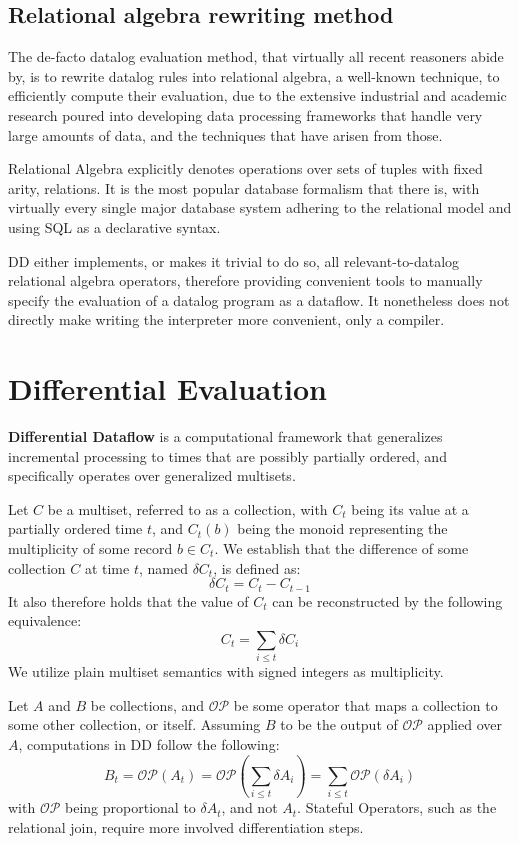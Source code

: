 \documentclass[sigconf,screen,review=false,natbib]{acmart}
\theoremstyle{definition}
\begin{document}
\subsection{Relational algebra rewriting method}
The de-facto datalog evaluation method, that virtually all recent reasoners\cite{bigdatalog, cog, nexus, recstep, dcdatalog, souffle} abide by, is to rewrite datalog rules into relational
algebra, a well-known technique, to efficiently compute their evaluation, due to the extensive industrial and academic
research poured into developing data processing frameworks that handle very large amounts of data, and the techniques
that have arisen from those.

Relational Algebra\cite{codd_1970} explicitly denotes operations over sets of tuples with fixed arity, relations. It
is the most popular database formalism that there is, with virtually every single major database system adhering to the
relational model\cite{pg,mysql,sqlserver} and using SQL as a declarative syntax.

DD either implements, or makes it trivial to do so, all relevant-to-datalog relational algebra operators, therefore
providing convenient tools to manually specify the evaluation of a datalog program as a dataflow. It nonetheless does
not directly make writing the interpreter more convenient, only a compiler.
\section{Differential Evaluation}
\textbf{Differential Dataflow} is a computational framework that generalizes incremental processing to times that are
possibly partially ordered, and specifically operates over generalized multisets.

Let $C$ be a multiset, referred to as a collection, with $C_t$ being its value at a partially ordered time $t$, and
$C_t(b)$ being the monoid representing the multiplicity of some record $b \in C_t$. We establish that the difference of
some collection $C$ at time $t$, named $\delta C_t$, is defined as: \[\delta C_t = C_t - C_{t - 1}\] It also therefore
holds that the value of $C_t$ can be reconstructed by the following equivalence: \[C_t = \sum_{i \leq t}\delta C_{i}\]
We utilize plain multiset semantics with signed integers as multiplicity.

Let $A$ and $B$ be collections, and $\mathcal{OP}$ be some operator that maps a collection to some other
collection, or itself. Assuming $B$ to be the output of $\mathcal{OP}$ applied over $A$, computations in
DD follow the following: \[B_t = \mathcal{OP}(A_t) = \mathcal{OP}(\sum_{i \leq t} \delta A_i) = \sum_{i \leq t} \mathcal{OP}(\delta A_i)\]
with $\mathcal{OP}$ being proportional to $\delta A_t$, and not $A_t$. Stateful Operators, such as the
relational join, require more involved differentiation steps.
\end{document}
